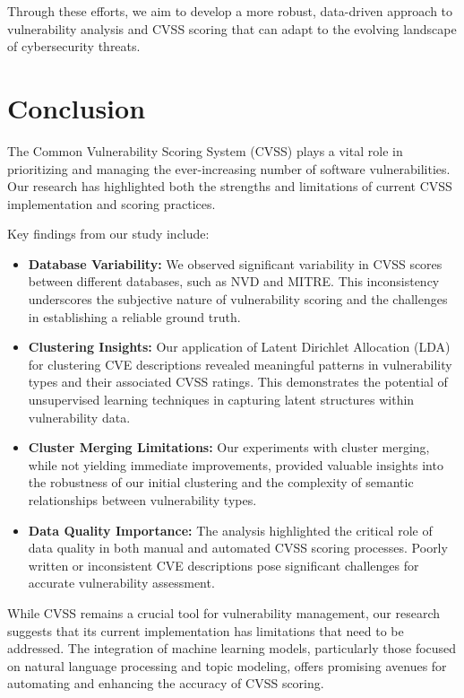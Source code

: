 \documentclass[12pt]{article}
\begin{document}
Through these efforts, we aim to develop a more robust, data-driven approach to vulnerability
analysis and CVSS scoring that can adapt to the evolving landscape of cybersecurity threats.

\section{Conclusion}

The Common Vulnerability Scoring System (CVSS) plays a vital role in prioritizing and managing the
ever-increasing number of software vulnerabilities. Our research has highlighted both the strengths
and limitations of current CVSS implementation and scoring practices.

Key findings from our study include:

\begin{itemize}

	\item \textbf{Database Variability:} We observed significant variability in CVSS scores between
	      different databases, such as NVD and MITRE. This inconsistency underscores the subjective
	      nature of vulnerability scoring and the challenges in establishing a reliable ground truth.

	\item \textbf{Clustering Insights:} Our application of Latent Dirichlet Allocation (LDA) for
	      clustering CVE descriptions revealed meaningful patterns in vulnerability types and their
	      associated CVSS ratings. This demonstrates the potential of unsupervised learning techniques
	      in capturing latent structures within vulnerability data.

	\item \textbf{Cluster Merging Limitations:} Our experiments with cluster merging, while not
	      yielding immediate improvements, provided valuable insights into the robustness of our
	      initial clustering and the complexity of semantic relationships between vulnerability types.

	\item \textbf{Data Quality Importance:} The analysis highlighted the critical role of data
	      quality in both manual and automated CVSS scoring processes. Poorly written or inconsistent
	      CVE descriptions pose significant challenges for accurate vulnerability assessment.

\end{itemize}

While CVSS remains a crucial tool for vulnerability management, our research suggests that its
current implementation has limitations that need to be addressed. The integration of machine
learning models, particularly those focused on natural language processing and topic modeling,
offers promising avenues for automating and enhancing the accuracy of CVSS scoring.
\end{document}
